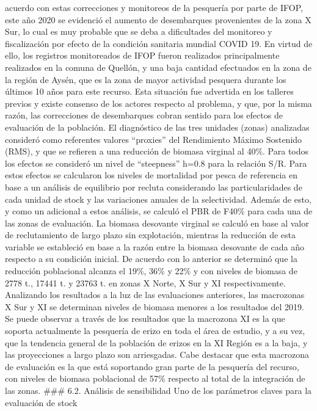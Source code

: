 \documentclass[
]{article}
\begin{document}
acuerdo con estas correcciones y monitoreos de la pesquería por parte de
IFOP, este año 2020 se evidenció el aumento de desembarques provenientes
de la zona X Sur, lo cual es muy probable que se deba a dificultades del
monitoreo y fiscalización por efecto de la condición sanitaria mundial
COVID 19. En virtud de ello, los registros monitoreados de IFOP fueron
realizados principalmente realizados en la comuna de Quellón, y una baja
cantidad efectuados en la zona de la región de Aysén, que es la zona de
mayor actividad pesquera durante los últimos 10 años para este recurso.
Esta situación fue advertida en los talleres previos y existe consenso
de los actores respecto al problema, y que, por la misma razón, las
correcciones de desembarques cobran sentido para los efectos de
evaluación de la población. El diagnóstico de las tres unidades (zonas)
analizadas consideró como referentes valores ``proxies'' del Rendimiento
Máximo Sostenido (RMS), y que se refieren a una reducción de biomasa
virginal al 40\%. Para todos los efectos se consideró un nivel de
``steepness'' h=0.8 para la relación S/R. Para estos efectos se
calcularon los niveles de mortalidad por pesca de referencia en base a
un análisis de equilibrio por recluta considerando las particularidades
de cada unidad de stock y las variaciones anuales de la selectividad.
Además de esto, y como un adicional a estos análisis, se calculó el PBR
de F40\% para cada una de las zonas de evaluación. La biomasa desovante
virginal se calculó en base al valor de reclutamiento de largo plazo sin
explotación, mientras la reducción de esta variable se estableció en
base a la razón entre la biomasa desovante de cada año respecto a su
condición inicial. De acuerdo con lo anterior se determinó que la
reducción poblacional alcanza el 19\%, 36\% y 22\% y con niveles de
biomasa de 2778 t., 17441 t. y 23763 t. en zonas X Norte, X Sur y XI
respectivamente. Analizando los resultados a la luz de las evaluaciones
anteriores, las macrozonas X Sur y XI se determinan niveles de biomasa
menores a los resultados del 2019. Se puede observar a través de los
resultados que la macrozona XI es la que soporta actualmente la
pesquería de erizo en toda el área de estudio, y a su vez, que la
tendencia general de la población de erizos en la XI Región es a la
baja, y las proyecciones a largo plazo son arriesgadas. Cabe destacar
que esta macrozona de evaluación es la que está soportando gran parte de
la pesquería del recurso, con niveles de biomasa poblacional de 57\%
respecto al total de la integración de las zonas. \#\#\# 6.2. Análisis
de sensibilidad Uno de los parámetros claves para la evaluación de stock
\end{document}
